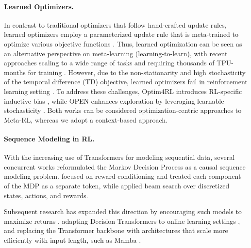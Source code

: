 \documentclass{article}
\theoremstyle{plain}
\theoremstyle{definition}
\theoremstyle{remark}
\begin{document}
\paragraph{Learned Optimizers.} In contrast to traditional optimizers that follow hand-crafted update rules, learned optimizers employ a parameterized update rule that is meta-trained to optimize various objective functions \cite{li2016learningoptimize, andrychowicz2016learninglearngradientdescent, metz2020tasksstabilityarchitecturecompute, almeida2021generalizableapproachlearningoptimizers}. Thus, learned optimization can be seen as an alternative perspective on meta-learning (learning-to-learn), with recent approaches scaling to a wide range of tasks and requiring thousands of TPU-months for training \cite{metz2022velotrainingversatilelearned}. However, due to the non-stationarity and high stochasticity of the temporal difference (TD) objective, learned optimizers fail in reinforcement learning setting \cite{metz2022velotrainingversatilelearned}. To address these challenges, Optim4RL introduces RL-specific inductive bias \cite{lan2024learningoptimizereinforcementlearning}, while OPEN enhances exploration by leveraging learnable stochasticity \cite{goldie2024learnedoptimizationmakereinforcement}. Both works can be considered optimization-centric approaches to Meta-RL, whereas we adopt a context-based approach.

\paragraph{Sequence Modeling in RL.} With the increasing use of Transformers for modeling sequential data, several concurrent works \cite{chen2021decisiontransformerreinforcementlearning, janner2021offlinereinforcementlearningbig} reformulated the Markov Decision Process as a causal sequence modeling problem. \citet{chen2021decisiontransformerreinforcementlearning} focused on reward conditioning and treated each component of the MDP as a separate token, while \citet{janner2021offlinereinforcementlearningbig} applied beam search over discretized states, actions, and rewards.

Subsequent research has expanded this direction by encouraging such models to maximize returns \cite{zhuang2024reinformermaxreturnsequencemodeling}, adapting Decision Transformers to online learning settings \cite{zheng2022onlinedecisiontransformer}, and replacing the Transformer backbone with architectures that scale more efficiently with input length, such as Mamba \cite{huang2024decisionmambareinforcementlearning}.
\end{document}

